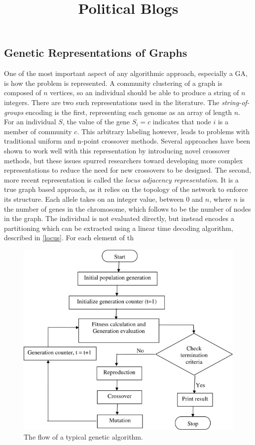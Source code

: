 \subsection{Genetic Representations of Graphs}
One of the most important aspect of any algorithmic approach, especially a GA, is how the problem is represented. A community clustering of a graph is composed of $n$ vertices, so an individual should be able to produce a string of $n$ integers. There are two such representations used in the literature. The \textit{string-of-groups} encoding is the first, representing each genome as an array of length $n$. For an individual $S$, the value of the gene $S_i=c$ indicates that node $i$ is a member of community $c$. This arbitrary labeling however, leads to problems with traditional uniform and n-point crossover methods. Several approaches have been shown to work well with this representation by introducing novel crossover methods\cite{Tasgin2006}, but these issues spurred researchers toward developing more complex representations to reduce the need for new crossovers to be designed.
The second, more recent representation is called the \textit{locus adjacency representation}. It is a true graph based approach, as it relies on the topology of the network to enforce its structure. Each allele takes on an integer value, between 0 and $n$, where $n$ is the number of genes in the chromosome, which follows to be the number of nodes in the graph. The individual is not evaluated directly, but instead encodes a partitioning which can be extracted using a linear time decoding algorithm, described in \ref{locus}. For each element of th

\begin{figure}[!htb]
	\title{Political Blogs}
	\begin{center}
		\includegraphics[scale=.75]{images/genetic_typical.png}
	\end{center}
	\caption{The flow of a typical genetic algorithm.}
	\label{logo}
\end{figure}

